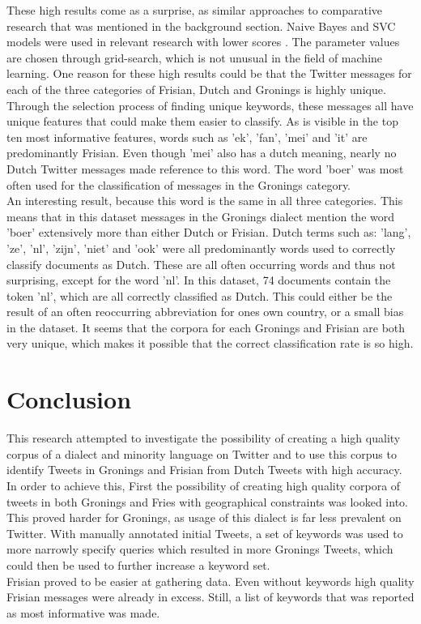 \documentclass[
10pt, %
a4paper, %
oneside, %
headinclude,footinclude, %
] {book}%
\begin{document}
These high results come as a surprise, as similar approaches to comparative research that was mentioned in the background section. Naive Bayes and SVC models were used in relevant research with lower scores \citep{bergsma}. The parameter values are chosen through grid-search, which is not unusual in the field of machine learning. One reason for these high results could be that the Twitter messages for each of the three categories of Frisian, Dutch and Gronings is highly unique. Through the selection process of finding unique keywords, these messages all have unique features that could make them easier to classify. As is visible in the top ten most informative features, words such as 'ek', 'fan', 'mei' and 'it' are predominantly Frisian. Even though 'mei' also has a dutch meaning, nearly no Dutch Twitter messages made reference to this word. The word 'boer' was most often used for the classification of messages in the Gronings category.  \\
An interesting result, because this word is the same in all three categories. This means that in this dataset messages in the Gronings dialect mention the word 'boer' extensively more than either Dutch or Frisian. Dutch terms such as: 'lang', 'ze', 'nl', 'zijn', 'niet' and 'ook' were all predominantly words used to correctly classify documents as Dutch. These are all often occurring words and thus not surprising, except for the word 'nl'. In this dataset, 74 documents contain the token 'nl', which are all correctly classified as Dutch. This could either be the result of an often reoccurring abbreviation for ones own country, or a small bias in the dataset. It seems that the corpora for each Gronings and Frisian are both very unique, which makes it possible that the correct classification rate is so high.

\chapter{Conclusion}
This research attempted to investigate the possibility of creating a high quality corpus of a dialect and minority language on Twitter and to use this corpus to identify Tweets in Gronings and Frisian from Dutch Tweets with high accuracy.
In order to achieve this, First the possibility of creating high quality corpora of tweets in both Gronings and Fries with geographical constraints was looked into. This proved harder for Gronings, as usage of this dialect is far less prevalent on Twitter. With manually annotated initial Tweets, a set of keywords was used to more narrowly specify queries which resulted in more Gronings Tweets, which could then be used to further increase a keyword set.\\
Frisian proved to be easier at gathering data. Even without keywords high quality Frisian messages were already in excess. Still, a list of keywords that was reported as most informative was made. \\
\end{document}
